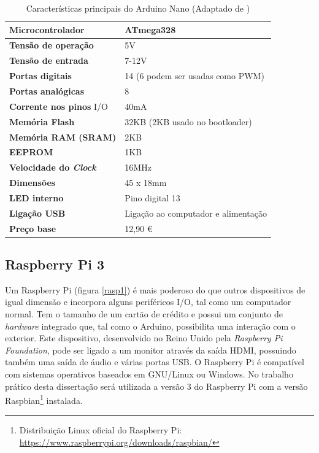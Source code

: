 \begin{table}[h]
	\centering
	
	\begin{tabular}{|
			>{\columncolor[HTML]{EFEFEF}}l |l|} \hline
		\textbf{Microcontrolador} & ATmega328 \\ \hline
		\textbf{Tensão de operação} & 5V \\ \hline
		\textbf{Tensão de entrada} & 7-12V \\ \hline
		\textbf{Portas digitais} & 14 (6 podem ser usadas como PWM) \\ \hline
		\textbf{Portas analógicas} & 8 \\ \hline
		\textbf{Corrente nos pinos} \ac{I/O} & 40mA \\ \hline
		\textbf{Memória Flash} & 32KB (2KB usado no bootloader) \\ \hline
		\textbf{Memória \acs{RAM} (SRAM)} & 2KB \\ \hline
		\textbf{EEPROM} & 1KB \\ \hline
		\textbf{Velocidade do \textit{Clock}} & 16MHz \\ \hline
		\textbf{Dimensões} & 45 x 18mm \\ \hline
		\textbf{\ac{LED} interno} & Pino digital 13 \\ \hline
		\textbf{Ligação \ac{USB}} & Ligação ao computador e alimentação \\ \hline
		\textbf{Preço base} & 12,90 \euro \footnotemark  \\ \hline
	\end{tabular}
	\caption[Características principais do Arduino Nano]{Características principais do Arduino Nano (Adaptado de \cite{Melorose2015})}
	\label{caraarduino}
\end{table}


\subsection{Raspberry Pi 3}

Um Raspberry Pi (figura \ref{rasp1}) é mais poderoso do que outros dispositivos de igual dimensão e incorpora alguns periféricos \ac{I/O}, tal como um computador normal. Tem o tamanho de um cartão de crédito e possui um conjunto de \textit{hardware} integrado que, tal como o Arduino, possibilita uma interação com o exterior. Este dispositivo, desenvolvido no Reino Unido pela \textit{Raspberry Pi Foundation}, pode ser ligado a um monitor através da saída HDMI, possuindo também uma saída de áudio e várias portas \ac{USB}. O Raspberry Pi é compatível com sistemas operativos baseados em GNU/Linux ou Windows. No trabalho prático desta dissertação será utilizada a versão 3 do Raspberry Pi com a versão Raspbian\footnote{Distribuição Linux oficial do Raspberry Pi:  \url{https://www.raspberrypi.org/downloads/raspbian/}} instalada\cite{RaspberryPiFoundation2012}.

